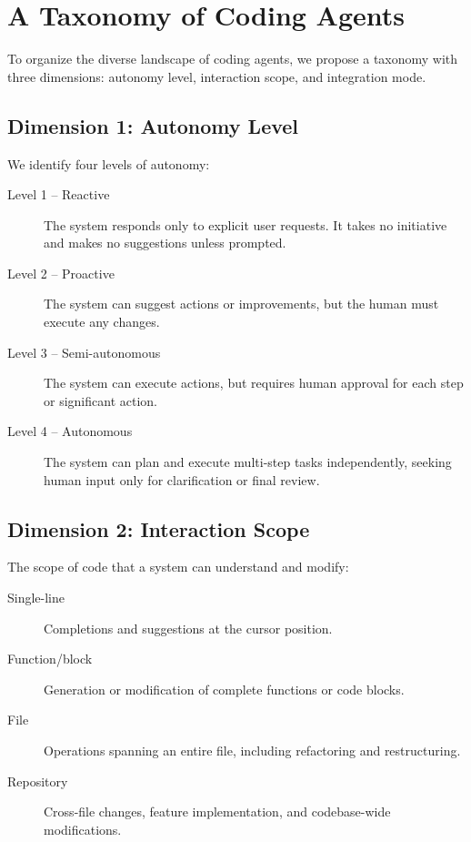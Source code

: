 \section{A Taxonomy of Coding Agents}
\label{sec:taxonomy}

To organize the diverse landscape of coding agents, we propose a taxonomy with three dimensions: autonomy level, interaction scope, and integration mode.

\subsection{Dimension 1: Autonomy Level}

We identify four levels of autonomy:

\begin{description}
    \item[Level 1 -- Reactive] The system responds only to explicit user requests. It takes no initiative and makes no suggestions unless prompted.
    \item[Level 2 -- Proactive] The system can suggest actions or improvements, but the human must execute any changes.
    \item[Level 3 -- Semi-autonomous] The system can execute actions, but requires human approval for each step or significant action.
    \item[Level 4 -- Autonomous] The system can plan and execute multi-step tasks independently, seeking human input only for clarification or final review.
\end{description}

\subsection{Dimension 2: Interaction Scope}

The scope of code that a system can understand and modify:

\begin{description}
    \item[Single-line] Completions and suggestions at the cursor position.
    \item[Function/block] Generation or modification of complete functions or code blocks.
    \item[File] Operations spanning an entire file, including refactoring and restructuring.
    \item[Repository] Cross-file changes, feature implementation, and codebase-wide modifications.
\end{description}


